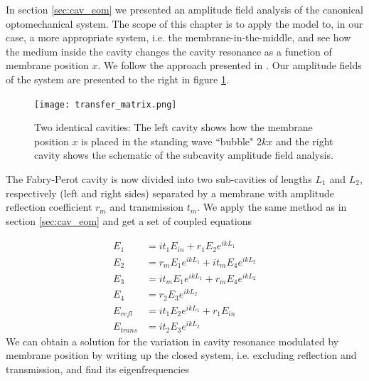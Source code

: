 In section \ref{sec:cav_eom} we presented an amplitude field analysis of the canonical optomechanical system. The scope of this chapter is to apply the model to, in our case, a more appropriate system, i.e. the    membrane-in-the-middle, and see how the medium inside the cavity changes the cavity resonance as a function of membrane position $x$. We follow the approach presented in \cite{jayich2008, Wilson2011}. Our amplitude fields of the system are presented to the right in figure \ref{fig:transfer_model}.

\begin{figure}[H]
\centering
\texttt{[image: transfer\_matrix.png]}
\caption{Two identical cavities: The left cavity shows how the membrane position $x$ is placed in the standing wave ``bubble" $2kx$ and the right cavity shows the schematic of the subcavity amplitude field analysis.}
\label{fig:transfer_model}
\end{figure}

The Fabry-Perot cavity is now divided into two sub-cavities of lengths $L_1$ and $L_2$, respectively (left and right sides) separated by a membrane with amplitude reflection coefficient $r_m$ and transmission $t_m$. We apply the same method as in section \ref{sec:cav_eom} and get a set of coupled equations

\begin{subequations}
\begin{align}
E_1 & = it_1E_{in} + r_1E_2e^{ikL_1} \\
E_2 & = r_mE_1e^{ikL_1} + it_mE_4e^{ikL_2} \\
E_3 & = it_mE_1e^{ikL_1} + r_mE_4e^{ikL_2} \\
E_4 & = r_2E_3e^{ikL_2} \\
E_{refl} & = it_1E_2e^{ikL_1} + r_1E_{in} \\
E_{trans} & = it_2E_3e^{ikL_2}
\end{align}
\end{subequations}
\noindent
We can obtain a solution for the variation in cavity resonance modulated by membrane position by writing up the closed system, i.e. excluding reflection and transmission, and find its eigenfrequencies

